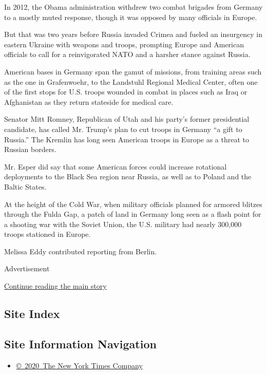 In 2012, the Obama administration withdrew two combat brigades from
Germany to a mostly muted response, though it was opposed by many
officials in Europe.

But that was two years before Russia invaded Crimea and fueled an
insurgency in eastern Ukraine with weapons and troops, prompting Europe
and American officials to call for a reinvigorated NATO and a harsher
stance against Russia.

American bases in Germany span the gamut of missions, from training
areas such as the one in Grafenwoehr, to the Landstuhl Regional Medical
Center, often one of the first stops for U.S. troops wounded in combat
in places such as Iraq or Afghanistan as they return stateside for
medical care.

Senator Mitt Romney, Republican of Utah and his party's former
presidential candidate, has called Mr. Trump's plan to cut troops in
Germany ``a gift to Russia.'' The Kremlin has long seen American troops
in Europe as a threat to Russian borders.

Mr. Esper did say that some American forces could increase rotational
deployments to the Black Sea region near Russia, as well as to Poland
and the Baltic States.

At the height of the Cold War, when military officials planned for
armored blitzes through the Fulda Gap, a patch of land in Germany long
seen as a flash point for a shooting war with the Soviet Union, the U.S.
military had nearly 300,000 troops stationed in Europe.

Melissa Eddy contributed reporting from Berlin.

Advertisement

\protect\hyperlink{after-bottom}{Continue reading the main story}

\hypertarget{site-index}{%
\subsection{Site Index}\label{site-index}}

\hypertarget{site-information-navigation}{%
\subsection{Site Information
Navigation}\label{site-information-navigation}}

\begin{itemize}
\tightlist
\item
  \href{https://help.nytimes3xbfgragh.onion/hc/en-us/articles/115014792127-Copyright-notice}{©~2020~The
  New York Times Company}
\end{itemize}

